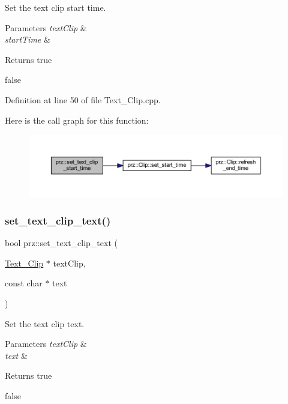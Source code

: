 Set the text clip start time. 


\begin{DoxyParams}{Parameters}
{\em text\+Clip} & \\
\hline
{\em start\+Time} & \\
\hline
\end{DoxyParams}
\begin{DoxyReturn}{Returns}
true 

false 
\end{DoxyReturn}


Definition at line 50 of file Text\+\_\+\+Clip.\+cpp.

Here is the call graph for this function\+:
\nopagebreak
\begin{figure}[H]
\begin{center}
\leavevmode
\includegraphics[width=350pt]{namespaceprz_aa7768ced397410c261e9ac6d1fecade5_cgraph}
\end{center}
\end{figure}
\mbox{\label{namespaceprz_add7a0ed63b75c519ee18b435f6883f50}} 
\subsubsection{\texorpdfstring{set\_text\_clip\_text()}{set\_text\_clip\_text()}}
{\footnotesize\ttfamily bool prz\+::set\+\_\+text\+\_\+clip\+\_\+text (\begin{DoxyParamCaption}\item[{\mbox{\hyperlink{classprz_1_1_text___clip}{Text\+\_\+\+Clip}} $\ast$}]{text\+Clip,  }\item[{const char $\ast$}]{text }\end{DoxyParamCaption})}



Set the text clip text. 


\begin{DoxyParams}{Parameters}
{\em text\+Clip} & \\
\hline
{\em text} & \\
\hline
\end{DoxyParams}
\begin{DoxyReturn}{Returns}
true 

false 
\end{DoxyReturn}


